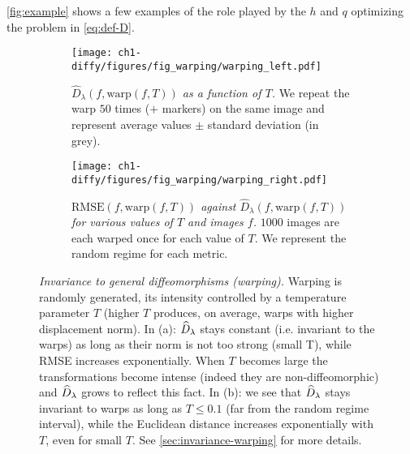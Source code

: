 \cref{fig:example} shows a few examples of the role played by the $h$ and $q$ optimizing the problem in \cref{eq:def-D}.


\begin{figure*}
    \centering
    \begin{subfigure}[t]{0.45\textwidth}
        \texttt{[image: ch1-diffy/figures/fig\_warping/warping\_left.pdf]}
        \label{fig:warping-left}
        \caption{\emph{$\widehat D_\lambda(f, \text{warp}(f, T))$ as a function of $T$.} We repeat the warp $50$ times ($+$ markers) on the same image and represent average values $\pm$ standard deviation (in grey).}
    \end{subfigure}\qquad
    \begin{subfigure}[t]{0.45\textwidth}
        \texttt{[image: ch1-diffy/figures/fig\_warping/warping\_right.pdf]}
        \caption{\emph{$\textrm{RMSE}(f, \textrm{warp}(f, T))$ against $\widehat D_\lambda(f, \textrm{warp}(f, T))$ for various values of $T$ and images $f$.} $1000$ images are each warped once for each value of $T$. We represent the random regime for each metric.}
    \end{subfigure}
    \caption[Invariance of Diffy to general diffeomorphisms (warping).]{\emph{Invariance to general diffeomorphisms (warping).} Warping is randomly generated, its intensity controlled by a temperature parameter $T$ (higher $T$ produces, on average, warps with higher displacement norm). In (a): $\widehat D_\lambda$ stays constant (i.e. invariant to the warps) as long as their norm is not too strong (small T), while RMSE increases exponentially. When $T$ becomes large the transformations become intense (indeed they are non-diffeomorphic) and $\widehat D_\lambda$ grows to reflect this fact.  In (b): we see that $\widehat D_\lambda$ stays invariant to warps as long as $T \leq 0.1$ (far from the random regime interval), while the Euclidean distance increases exponentially with $T$, even for small $T$. See \cref{sec:invariance-warping} for more details.}
    \label{fig:warping}
\end{figure*}



